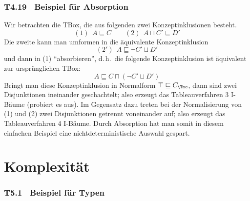 \documentclass[fontsize=11pt, twoside=false, numbers=autoenddot]{scrbook}
\begin{document}
\section*{T4.19~ Beispiel für Absorption}

Wir betrachten die TBox, die aus folgenden zwei Konzeptinklusionen besteht.
%
\[
  (1)~~ A \sqsubseteq C
  \qquad
  (2)~~ A \sqcap C' \sqsubseteq D'
\]
Die zweite kann man umformen in die äquivalente Konzeptinklusion
\[
  (2')~~ A \sqsubseteq \lnot C' \sqcup D'
\]
und dann in (1) "`absorbieren"', d.\,h.\ die folgende Konzeptinklusion ist äquivalent
zur ursprünglichen TBox:
\[
  A \sqsubseteq C \sqcap (\lnot C' \sqcup D')
\]
Bringt man diese Konzeptinklusion in Normalform $\top \sqsubseteq C_\Tmc$,
dann sind zwei Disjunktionen ineinander geschachtelt;
also erzeugt das Tableauverfahren 3 I-Bäume (probiert es aus).
Im Gegensatz dazu treten bei der Normalisierung von (1) und (2)
zwei Disjunktionen getrennt voneinander auf;
also erzeugt das Tableauverfahren 4 I-Bäume.
Durch Absorption hat man somit in diesem einfachen Beispiel
eine nichtdeterministische Auswahl gespart.

\goodbreak

\part{Komplexität}


\section*{T5.1~ Beispiel für Typen}
\end{document}
